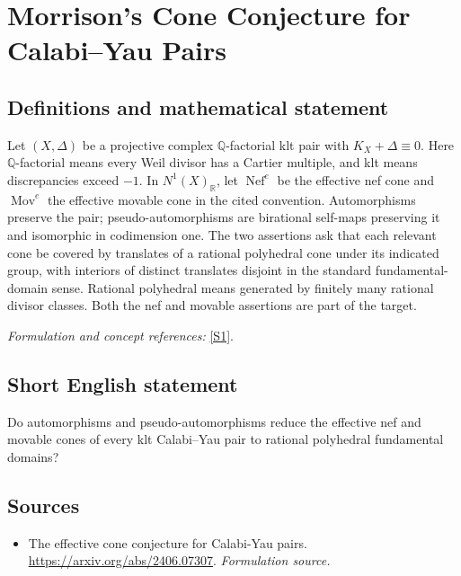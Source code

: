 \documentclass[11pt]{article}
\begin{document}
\section*{\texorpdfstring{Morrison’s Cone Conjecture for Calabi–Yau Pairs}{Morrison’s Cone Conjecture for Calabi–Yau Pairs}}\label{30001574}
\subsection{Definitions and mathematical statement}
Let $(X,\Delta)$ be a projective complex ${\mathbb{Q}}$-factorial klt pair with $K_X+\Delta\equiv0$. Here ${\mathbb{Q}}$-factorial means every Weil divisor has a Cartier multiple, and klt means discrepancies exceed $-1$. In $N^1(X)_{{\mathbb{R}}}$, let $\operatorname{Nef}^e$ be the effective nef cone and $\operatorname{Mov}^e$ the effective movable cone in the cited convention. Automorphisms preserve the pair; pseudo-automorphisms are birational self-maps preserving it and isomorphic in codimension one. The two assertions ask that each relevant cone be covered by translates of a rational polyhedral cone under its indicated group, with interiors of distinct translates disjoint in the standard fundamental-domain sense. Rational polyhedral means generated by finitely many rational divisor classes. Both the nef and movable assertions are part of the target.
\par\smallskip\textit{Formulation and concept references:} \href{https://arxiv.org/abs/2406.07307}{[S1]}.

\subsection{Short English statement}
Do automorphisms and pseudo-automorphisms reduce the effective nef and movable cones of every klt Calabi–Yau pair to rational polyhedral fundamental domains?
\subsection{Sources}
\begin{itemize}
\item[S1]The effective cone conjecture for Calabi-Yau pairs.
\url{https://arxiv.org/abs/2406.07307}.
\textit{Formulation source.}
\end{itemize}
\end{document}
